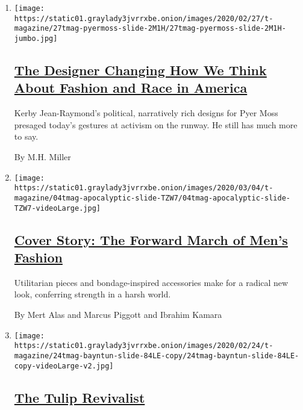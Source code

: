 \begin{enumerate}
\def\labelenumi{\arabic{enumi}.}
\item
  \texttt{[image: https://static01.graylady3jvrrxbe.onion/images/2020/02/27/t-magazine/27tmag-pyermoss-slide-2M1H/27tmag-pyermoss-slide-2M1H-jumbo.jpg]}

  \hypertarget{the-designer-changing-how-we-think-about-fashion-and-race-in-america}{%
  \subsection{\texorpdfstring{\href{/2020/03/05/t-magazine/pyer-moss-kerby-jean-raymond.html}{The
  Designer Changing How We Think About Fashion and Race in
  America}}{The Designer Changing How We Think About Fashion and Race in America}}\label{the-designer-changing-how-we-think-about-fashion-and-race-in-america}}

  Kerby Jean-Raymond's political, narratively rich designs for Pyer Moss
  presaged today's gestures at activism on the runway. He still has much
  more to say.

  By M.H. Miller
\item
  \texttt{[image: https://static01.graylady3jvrrxbe.onion/images/2020/03/04/t-magazine/04tmag-apocalyptic-slide-TZW7/04tmag-apocalyptic-slide-TZW7-videoLarge.jpg]}

  \hypertarget{cover-story-the-forward-march-of-mens-fashion}{%
  \subsection{\texorpdfstring{\href{/2020/03/04/t-magazine/mens-fashion-spring-trends.html}{Cover
  Story: The Forward March of Men's
  Fashion}}{Cover Story: The Forward March of Men's Fashion}}\label{cover-story-the-forward-march-of-mens-fashion}}

  Utilitarian pieces and bondage-inspired accessories make for a radical
  new look, conferring strength in a harsh world.

  By Mert Alas and Marcus Piggott and Ibrahim Kamara
\item
  \texttt{[image: https://static01.graylady3jvrrxbe.onion/images/2020/02/24/t-magazine/24tmag-bayntun-slide-84LE-copy/24tmag-bayntun-slide-84LE-copy-videoLarge-v2.jpg]}

  \hypertarget{the-tulip-revivalist}{%
  \subsection{\texorpdfstring{\href{/2020/02/24/t-magazine/polly-nicholson-bayntun-flowers.html}{The
  Tulip Revivalist}}{The Tulip Revivalist}}\label{the-tulip-revivalist}}


\end{enumerate}
